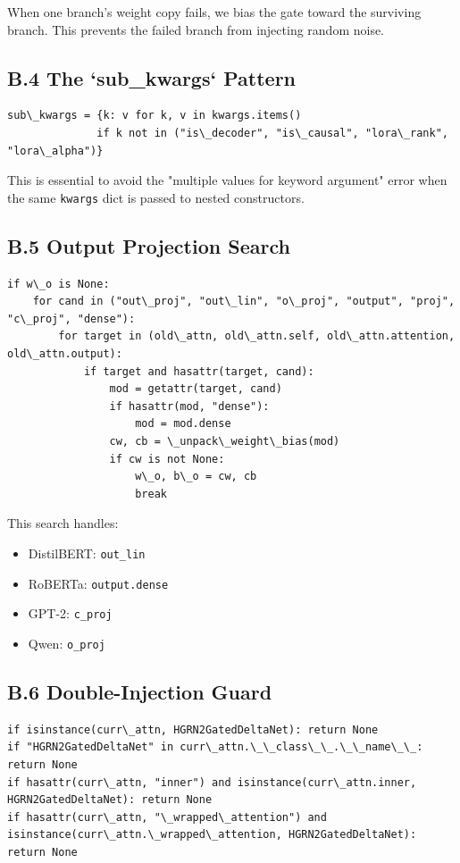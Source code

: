 When one branch's weight copy fails, we bias the gate toward the surviving 
branch. This prevents the failed branch from injecting random noise.

\subsection{B.4 The `sub\_kwargs` Pattern}

\begin{lstlisting}
sub\_kwargs = {k: v for k, v in kwargs.items() 
              if k not in ("is\_decoder", "is\_causal", "lora\_rank", "lora\_alpha")}
\end{lstlisting}

This is essential to avoid the "multiple values for keyword argument" error 
when the same \texttt{kwargs} dict is passed to nested constructors.

\subsection{B.5 Output Projection Search}

\begin{lstlisting}
if w\_o is None:
    for cand in ("out\_proj", "out\_lin", "o\_proj", "output", "proj", "c\_proj", "dense"):
        for target in (old\_attn, old\_attn.self, old\_attn.attention, old\_attn.output):
            if target and hasattr(target, cand):
                mod = getattr(target, cand)
                if hasattr(mod, "dense"):
                    mod = mod.dense
                cw, cb = \_unpack\_weight\_bias(mod)
                if cw is not None:
                    w\_o, b\_o = cw, cb
                    break
\end{lstlisting}

This search handles:
\begin{itemize}
\item DistilBERT: \texttt{out\_lin}
\item RoBERTa: \texttt{output.dense}
\item GPT-2: \texttt{c\_proj}
\item Qwen: \texttt{o\_proj}

\end{itemize}
\subsection{B.6 Double-Injection Guard}

\begin{lstlisting}
if isinstance(curr\_attn, HGRN2GatedDeltaNet): return None
if "HGRN2GatedDeltaNet" in curr\_attn.\_\_class\_\_.\_\_name\_\_: return None
if hasattr(curr\_attn, "inner") and isinstance(curr\_attn.inner, HGRN2GatedDeltaNet): return None
if hasattr(curr\_attn, "\_wrapped\_attention") and isinstance(curr\_attn.\_wrapped\_attention, HGRN2GatedDeltaNet): return None
\end{lstlisting}

